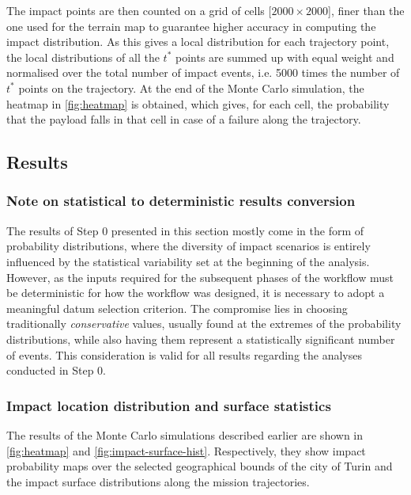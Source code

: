 The impact points are then counted on a grid of cells [$2000 \times 2000$], finer than the one used for the terrain map to guarantee higher accuracy in computing the impact distribution. As this gives a local distribution for each trajectory point, the local distributions of all the $t^*$ points are summed up with equal weight and normalised over the total number of impact events, i.e. 5000 times the number of $t^*$ points on the trajectory. At the end of the Monte Carlo simulation, the heatmap in \cref{fig:heatmap} is obtained, which gives, for each cell, the probability that the payload falls in that cell in case of a failure along the trajectory.




\subsection{Results}
\subsubsection{Note on statistical to deterministic results conversion}
The results of Step 0 presented in this section mostly come in the form of probability distributions, where the diversity of impact scenarios is entirely influenced by the statistical variability set at the beginning of the analysis. However, as the inputs required for the subsequent phases of the workflow must be deterministic for how the workflow was designed, it is necessary to adopt a meaningful datum selection criterion. The compromise lies in choosing traditionally \textit{conservative} values, usually found at the extremes of the probability distributions, while also having them represent a statistically significant number of events. This consideration is valid for all results regarding the analyses conducted in Step 0.


\subsubsection{Impact location distribution and surface statistics}    %
The results of the Monte Carlo simulations described earlier are shown in \cref{fig:heatmap} and \cref{fig:impact-surface-hist}. Respectively, they show impact probability maps over the selected geographical bounds of the city of Turin and the impact surface distributions along the mission trajectories.

